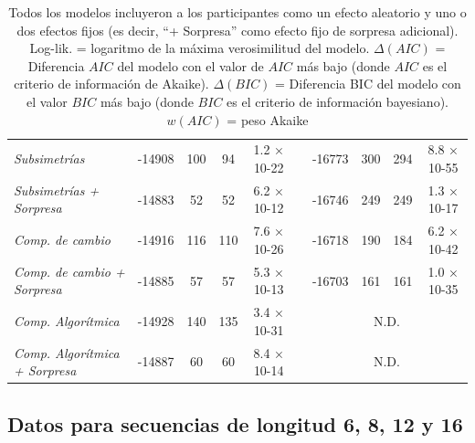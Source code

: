 \begin{table}[]
{\begin{tabular}{lccccccccc}
\textit{Subsimetrías}         & -14908        & 100        & 94        & 1.2 × 10-22    &                & -16773        & 300         & 294        & 8.8 × 10-55    \\
\textit{Subsimetrías + Sorpresa}    & -14883        & 52         & 52        & 6.2 × 10-12    &                & -16746        & 249         & 249        & 1.3 × 10-17    \\
\textit{Comp. de cambio}       & -14916        & 116        & 110        & 7.6 × 10-26    &                & -16718        & 190         & 184        & 6.2 × 10-42    \\
\textit{Comp. de cambio + Sorpresa}  & -14885        & 57         & 57        & 5.3 × 10-13    &                & -16703        & 161         & 161        & 1.0 × 10-35    \\
\textit{Comp. Algorítmica}      & -14928        & 140        & 135        & 3.4 × 10-31    &                & \multicolumn{4}{c}{N.D.}                               \\
\textit{Comp. Algorítmica + Sorpresa} & -14887        & 60         & 60        & 8.4 × 10-14    &                & \multicolumn{4}{c}{N.D.}                               \\ \hline
\end{tabular}}

\caption{Todos los modelos incluyeron a los participantes como un efecto aleatorio y uno o dos efectos fijos (es decir, ``+ Sorpresa'' como efecto fijo de sorpresa adicional). Log-lik. = logaritmo de la máxima verosimilitud del modelo. $\Delta (AIC)$ = Diferencia $AIC$ del modelo con el valor de $AIC$ más bajo (donde $AIC$ es el criterio de información de Akaike). $\Delta (BIC)$ = Diferencia BIC del modelo con el valor $BIC$ más bajo (donde $BIC$ es el criterio de información bayesiano). $w(AIC)$ = peso Akaike}
\label{PlosBIO-T2}
\end{table}


\subsection{Datos para secuencias de longitud 6, 8, 12 y 16}

